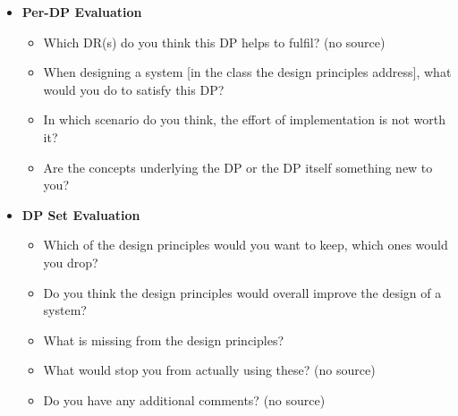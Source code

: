 \begin{itemize}[noitemsep]
    \item \textbf{Per-\ac{DP} Evaluation}
    \begin{itemize}[noitemsep]
        \item Which DR(s) do you think this DP helps to fulfil? (no source)
        \item When designing a system [in the class the design principles address], what would you do to satisfy this DP? \parencite[\textbf{Actability \& Guidance};][]{Iivari2021}
        \item In which scenario do you think, the effort of implementation is not worth it? \parencite[\textbf{Importance};][]{Iivari2021}
        \item Are the concepts underlying the DP or the DP itself something new to you? \parencite[\textbf{Novelty};][]{Iivari2021}
    \end{itemize}
    \item \textbf{\ac{DP} Set Evaluation}
    \begin{itemize}[noitemsep]
        \item Which of the design principles would you want to keep, which ones would you drop? \parencite[\textbf{Redundancy}, \textbf{Excess};][\textit{omitted}]{Janiesch2020}
        \item Do you think the design principles would overall improve the design of a system? \parencite[\textbf{Effectiveness};][]{Iivari2021}
        \item What is missing from the design principles? \parencite[\textbf{Deficit};][]{Janiesch2020}
        \item What would stop you from actually using these? (no source)
        \item Do you have any additional comments? (no source)
    \end{itemize}
\end{itemize}
